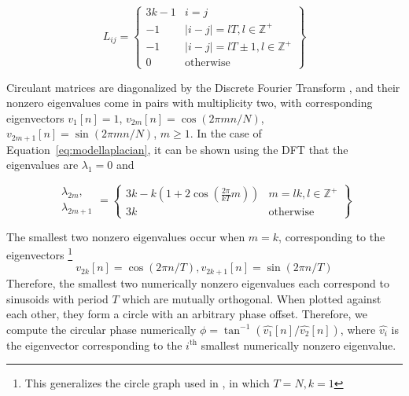 \documentclass{article}
\begin{document}
\begin{equation}
\label{eq:modellaplacian}
L_{ij} = \left\{ \begin{array}{cc} 3k-1 & i = j \\ -1 & |i-j| = lT, l \in \mathbb{Z}^+ \\ -1 & |i-j| = lT \pm 1, l \in \mathbb{Z}^+ \\ 0 & \text{otherwise} \end{array} \right\}
\end{equation}

Circulant matrices are diagonalized by the Discrete Fourier Transform \cite{godsil2013algebraic}, and their nonzero eigenvalues come in pairs with multiplicity two, with corresponding eigenvectors $v_1[n] = 1$, $v_{2m}[n] = \cos(2 \pi mn / N)$, $v_{2m+1}[n] = \sin(2 \pi m n / N)$, $m \geq 1$.  In the case of Equation~\ref{eq:modellaplacian}, it can be shown using the DFT that the eigenvalues are $\lambda_1 = 0$ and 

\begin{equation}
\begin{array}{cc}\lambda_{2m},\\\lambda_{2m+1}\end{array} = \left\{ \begin{array}{cc} 3k - k\left( 1 + 2 \cos \left( \frac{2 \pi}{kT} m \right) \right) & m = lk, l \in \mathbb{Z}^+ \\ 3k & \text{otherwise}  \end{array} \right\} 
\end{equation}

The smallest two nonzero eigenvalues occur when $m = k$, corresponding to the eigenvectors \footnote{This generalizes the circle graph used in \cite{averbuch2015ringit}, in which $T = N, k = 1$} 
\begin{equation}
v_{2k}[n] = \cos(2 \pi n / T), v_{2k+1}[n] = \sin(2 \pi n / T)
\end{equation}
Therefore, the smallest two numerically nonzero eigenvalues each correspond to sinusoids with period $T$ which are mutually orthogonal.  When plotted against each other, they form a circle with an arbitrary phase offset.  Therefore, we compute the circular phase numerically $\phi = \tan^{-1}(\hat{v_1}[n] / \hat{v_2}[n])$, where $\hat{v_i}$ is the eigenvector corresponding to the $i^\text{th}$ smallest numerically nonzero eigenvalue.
\end{document}
